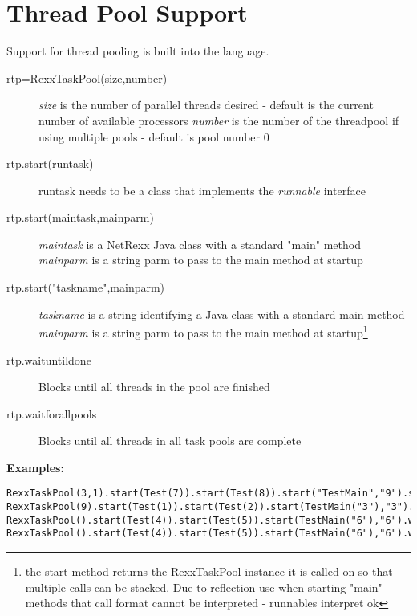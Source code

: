 \section{Thread Pool Support}\label{refthreads}

 Support for thread pooling is built into the \nr{} language. 


\begin{description}
\item[rtp=RexxTaskPool(size,number)]
\emph{size} is the number of parallel threads desired - default is the current number of available processors
\emph{number} is the number of the threadpool if using multiple pools - default is pool number 0

\item[rtp.start(runtask)]
runtask needs to be a class that implements the \emph{runnable} interface

\item[rtp.start(maintask,mainparm)]
\emph{maintask} is a NetRexx Java class with a standard "main" method
\emph{mainparm} is a string parm to pass to the main method at startup

\item[rtp.start("taskname",mainparm)]
\emph{taskname} is a string identifying a Java class with a standard main method
\emph{mainparm} is a string parm to pass to the main method at
startup\footnote{the start method returns the RexxTaskPool instance it
  is called on so that multiple calls can be stacked. Due to reflection use when starting "main" methods that call format cannot be interpreted - runnables interpret ok}

\item[rtp.waituntildone]
Blocks until all threads in the pool are finished

\item[rtp.waitforallpools]
Blocks until all threads in all task pools are complete
\end{description}

\textbf{Examples:}
\begin{lstlisting}[label=threadpool,caption=ThreadPool example]
RexxTaskPool(3,1).start(Test(7)).start(Test(8)).start("TestMain","9").start("enviroscan")
RexxTaskPool(9).start(Test(1)).start(Test(2)).start(TestMain("3"),"3").start(enviroscan.class)
RexxTaskPool().start(Test(4)).start(Test(5)).start(TestMain("6"),"6").waituntildone
RexxTaskPool().start(Test(4)).start(Test(5)).start(TestMain("6"),"6").waitforallpools
\end{lstlisting}